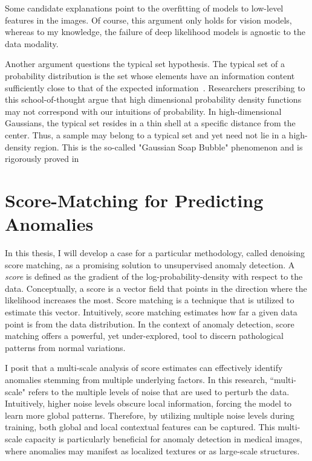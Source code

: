 Some candidate explanations point to the overfitting of models to low-level features in the images. Of course, this argument only holds for vision models, whereas to my knowledge, the failure of deep likelihood models is agnostic to the data modality.

Another argument questions the typical set hypothesis.
The typical set of a probability distribution is the set whose elements have an information content sufficiently close to that of the expected information~\cite{shannon_1948}.
Researchers prescribing to this school-of-thought argue that high dimensional probability density functions may not correspond with our intuitions of probability. In high-dimensional Gaussians, the typical set resides in a thin shell at a specific distance from the center. Thus, a sample may belong to a typical set and yet need not lie in a high-density region. This is the so-called "Gaussian Soap Bubble" phenomenon and is rigorously proved in \cite{vershynin2018high}


\section{Score-Matching for Predicting Anomalies}

In this thesis, I will develop a case for a particular methodology, called denoising score matching, as a promising solution to unsupervised anomaly detection. A \textit{score} is defined as the gradient of the log-probability-density with respect to the data. Conceptually, a score is a vector field that points in the direction where the likelihood increases the most. Score matching is a technique that is utilized to estimate this vector. Intuitively, score matching estimates how far a given data point is from the data distribution. In the context of anomaly detection, score matching offers a powerful, yet under-explored, tool to discern pathological patterns from normal variations.

I posit that a multi-scale analysis of score estimates can effectively identify anomalies stemming from multiple underlying factors. In this research, ``multi-scale" refers to the multiple levels of noise that are used to perturb the data. Intuitively, higher noise levels obscure local information, forcing the model to learn more global patterns. Therefore, by utilizing multiple noise levels during training, both global and local contextual features can be captured. This multi-scale capacity is particularly beneficial for anomaly detection in medical images, where anomalies may manifest as localized textures or as large-scale structures.


